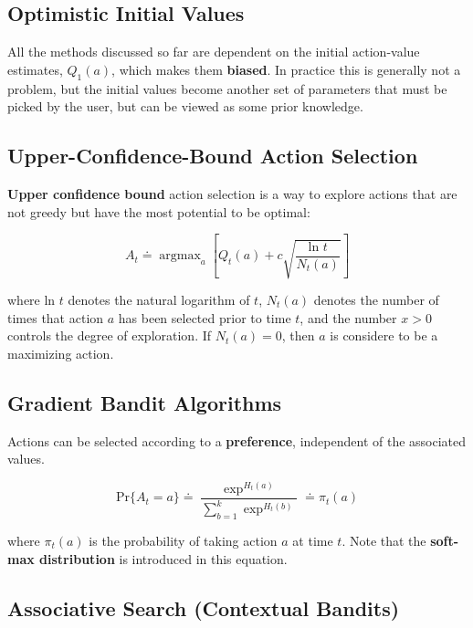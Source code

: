 \documentclass[11pt]{article}
\DeclareMathOperator*{\argmax}{argmax}
\begin{document}
\subsection{Optimistic Initial Values}
\label{sec:orgfc386da}

All the methods discussed so far are dependent on the initial action-value
estimates, \(Q_1(a)\), which makes them \textbf{biased}. In practice this is generally
not a problem, but the initial values become another set of parameters that must
be picked by the user, but can be viewed as some prior knowledge.

\subsection{Upper-Confidence-Bound Action Selection}
\label{sec:org7da88e3}

\textbf{Upper confidence bound} action selection is a way to explore actions that are
not greedy but have the most potential to be optimal:

\begin{equation}
A_t \doteq \argmax_{a} \left[ Q_t(a) + c \sqrt{\frac{\text{ln } t}{N_t(a)}}
\right]
\end{equation}

where ln \(t\) denotes the natural logarithm of \(t\), \(N_t(a)\) denotes the number
of times that action \(a\) has been selected prior to time \(t\), and the number \(x
> 0\) controls the degree of exploration. If \(N_t(a) = 0\), then \(a\) is considere
to be a maximizing action.

\subsection{Gradient Bandit Algorithms}
\label{sec:orgd1267c6}

Actions can be selected according to a \textbf{preference}, independent of the associated
values.

\begin{equation}
\text{Pr}\{A_t = a\} \doteq \frac{\exp^{H_t(a)}}{\sum_{b=1}^{k} \exp^{H_t(b)}} \doteq
\pi_t(a)
\end{equation}

where \(\pi_t(a)\) is the probability of taking action \(a\) at time \(t\). Note that
the \textbf{soft-max distribution} is introduced in this equation.

\subsection{Associative Search (Contextual Bandits)}
\label{sec:orgc7a9c61}
\end{document}
